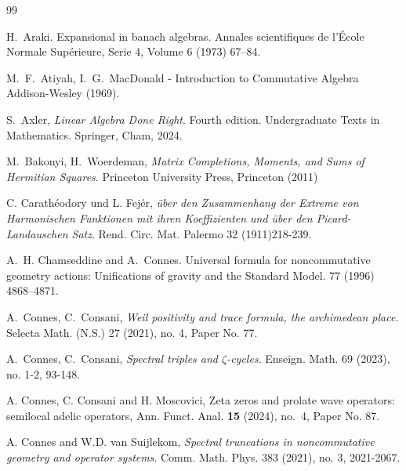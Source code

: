 \documentclass{amsart}
\begin{document}
\begin{thebibliography}{99}

  H.~Araki. Expansional in banach algebras. Annales scientifiques de l'École Normale Supérieure, Serie 4, Volume 6 (1973) 67--84.
  
   M.~F.~Atiyah, I.~G.~MacDonald -{ Introduction to Commutative Algebra} Addison-Wesley (1969).
  
 S.~Axler, {\em  Linear Algebra Done Right}.
Fourth edition. Undergraduate Texts in Mathematics. Springer, Cham, 2024. 

 M.~Bakonyi, H.~Woerdeman, {\em Matrix Completions, Moments, and Sums of Hermitian Squares}. Princeton University Press, Princeton (2011)

C. Carathéodory und L. Fejér, {\em über den Zusammenhang der Extreme von Harmonischen Funktionen mit ihren Koeffizienten und über den Picard-Landauschen Satz}. Rend. Circ. Mat. Palermo 32 (1911)218-239. 
  


A.~H. Chamseddine and A.~Connes.
\newblock Universal formula for noncommutative geometry actions: {U}nifications
  of gravity and the {S}tandard {M}odel.
 77 (1996)  4868--4871.
  
 A.~Connes, C.~Consani, {\em Weil positivity and trace formula, the archimedean place}. Selecta Math. (N.S.) 27 (2021), no. 4, Paper No. 77.%

 A.~Connes, C.~Consani,  {\em Spectral triples and $\zeta$-cycles}. Enseign. Math. 69 (2023), no. 1-2, 93-148.


A. Connes, C. Consani and H. Moscovici, Zeta zeros and prolate wave operators: semilocal adelic operators, Ann. Funct. Anal. {\bf 15} (2024), no.~4, Paper No. 87.
  
  A. Connes and W.D. van Suijlekom, {\em Spectral truncations in noncommutative geometry and operator systems}. Comm. Math. Phys. 383 (2021), no. 3, 2021-2067. 


\end{thebibliography}
\end{document}
